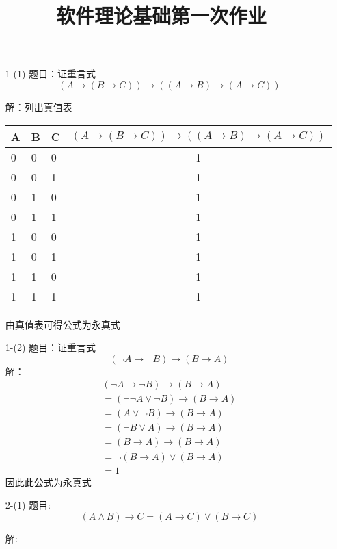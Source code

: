 \documentclass[11pt,oneside,a4paper]{article}
\title{软件理论基础第一次作业 }
\begin{document}
\maketitle
    \begin{itemize}
        \item[1-(1)]
        题目：证重言式\[(A \to (B \to C)) \to ((A \to B) \to (A \to C))\] \par
        解：列出真值表
        \begin{table}[!h]
        \centering
            \begin{tabular}{|l|l|l|c|}
            \hline
            A  & B  & C  & $(A \to (B \to C)) \to ((A \to B) \to (A \to C))$ \\ \hline
            0  & 0 &  0  & 1 \\ \hline
            0  & 0 &  1  & 1\\ \hline
            0  & 1 &  0  & 1 \\ \hline
            0  & 1 &  1  & 1 \\ \hline
            1  & 0 &  0  & 1 \\ \hline
            1  & 0 &  1  & 1 \\ \hline
            1  & 1 &  0  & 1 \\ \hline
            1  & 1 &  1  & 1 \\ \hline
            \end{tabular}
            \end{table}
        由真值表可得公式为永真式
        \item[1-(2)] 
        题目：证重言式\[(\neg A \to \neg B) \to (B \to A)\]
        解：
        \[\begin{array}{l}
            (\neg A \to \neg B) \to (B \to A)\\
             = (\neg \neg A \vee \neg B) \to (B \to A)\\
             = (A \vee \neg B) \to (B \to A)\\
             = (\neg B \vee A) \to (B \to A)\\
             = (B \to A) \to (B \to A)\\
             = \neg (B \to A) \vee (B \to A)\\
             = 1
            \end{array}\]
        因此此公式为永真式
        \item[2-(1)]
        题目:  \[(A \wedge B) \to C = (A \to C) \vee (B \to C)\] \par 
        解:
    \[\begin{array}{l}

\end{array}\]
\end{itemize}
\end{document}

